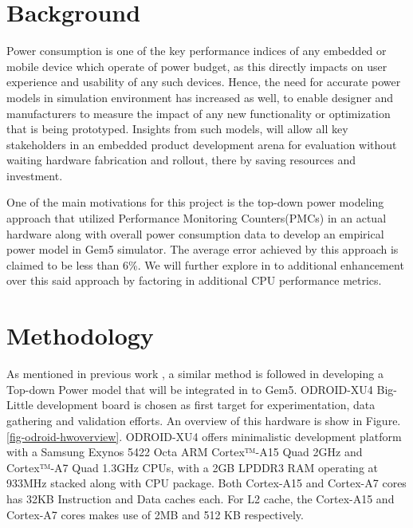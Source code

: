 \documentclass[conference]{IEEEtran}
\begin{document}
\section{Background}
    \par Power consumption is one of the key performance indices of any embedded or mobile device which operate of power budget, as this directly impacts on user experience and usability of any such devices. Hence, the need for accurate power models in simulation environment has increased as well, to enable designer and manufacturers to measure the impact of any new functionality or optimization that is being prototyped. Insights from such models, will allow all key stakeholders in an embedded product development arena for evaluation without waiting hardware fabrication and rollout, there by saving resources and investment.

    \par One of the main motivations for this project is the top-down power modeling approach\cite{Reddy2017EmpiricalCP} that utilized Performance Monitoring Counters(PMCs) in an actual hardware along with overall power consumption data to develop an empirical power model in Gem5 simulator\cite{8718630}. The average error achieved by this approach is claimed to be less than 6\%. We will further explore in to additional enhancement over this said approach by factoring in additional CPU performance metrics.

\section{Methodology}
    \par As mentioned in previous work \cite{Reddy2017EmpiricalCP}, a similar method is followed in developing a Top-down Power model that will be integrated in to Gem5. ODROID-XU4\cite{odroid-xu4} Big-Little development board is chosen as first target for experimentation, data gathering and validation efforts. An overview of this hardware is show in Figure. \ref{fig-odroid-hwoverview}. ODROID-XU4 offers minimalistic development platform with a Samsung Exynos 5422 Octa ARM Cortex™-A15 Quad 2GHz and Cortex™-A7 Quad 1.3GHz CPUs, with a 2GB LPDDR3 RAM operating at 933MHz stacked along with CPU package. Both Cortex-A15 and Cortex-A7 cores has 32KB Instruction and Data caches each. For L2 cache, the Cortex-A15 and Cortex-A7 cores makes use of 2MB and 512 KB respectively.
\end{document}
